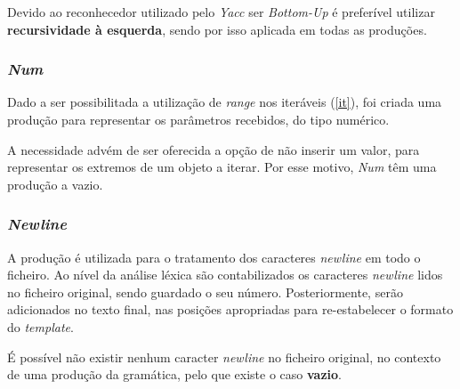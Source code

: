 \documentclass[../relatorio.tex]{subfiles}
\begin{document}
Devido ao reconhecedor utilizado pelo \textit{Yacc} ser \textit{Bottom-Up}
é preferível utilizar \textbf{recursividade à esquerda}, sendo por isso 
aplicada em todas as produções.
\subsubsection{\textit{Num}} \label{grm:num}
Dado a ser possibilitada a utilização de \textit{range} nos iteráveis (\ref{it}),
foi criada uma produção para representar os parâmetros recebidos, do tipo numérico.

A necessidade advém de ser oferecida a opção de não inserir um valor, para representar
os extremos de um objeto a iterar.
Por esse motivo, \textit{Num} têm uma produção a vazio.

\subsubsection{\textit{Newline}} \label{grm:nl}
A produção é utilizada para o tratamento dos caracteres \textit{newline}
em todo o ficheiro.
Ao nível da análise léxica são contabilizados os caracteres \textit{newline}
lidos no ficheiro original, sendo guardado o seu número.
Posteriormente, serão adicionados no texto final, nas 
posições apropriadas para re-estabelecer o formato do \textit{template}.

É possível não existir nenhum caracter \textit{newline} no ficheiro original,
no contexto de uma produção da gramática, pelo que existe o caso \textbf{vazio}.
\end{document}
